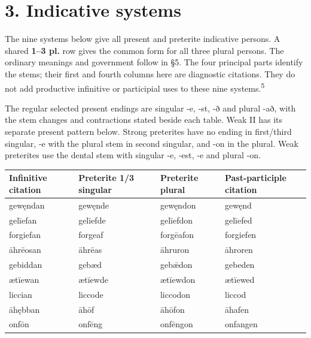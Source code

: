 \section*{3. Indicative systems}

The nine systems below give all present and preterite indicative persons. A shared \textbf{1–3 pl.} row gives the common form for all three plural persons. The ordinary meanings and government follow in §5. The four principal parts identify the stems; their first and fourth columns here are diagnostic citations. They do not add productive infinitive or participial uses to these nine systems.\textsuperscript{5}

The regular selected present endings are singular -e, -st, -ð and plural -að, with the stem changes and contractions stated beside each table. Weak II has its separate present pattern below. Strong preterites have no ending in first/\allowbreak{}third singular, -e with the plural stem in second singular, and -on in the plural. Weak preterites use the dental stem with singular -e, -est, -e and plural -on.

\par\begingroup
\fontsize{10.5}{13.2}\selectfont
\setlength{\LTleft}{0pt}\setlength{\LTright}{\fill}
\noindent
\begin{tabular}{@{}>{\raggedright\arraybackslash}p{27.02mm}>{\raggedright\arraybackslash}p{28.55mm}>{\raggedright\arraybackslash}p{23.36mm}>{\raggedright\arraybackslash}p{36.63mm}@{}}
\toprule
\textbf{Infinitive citation} & \textbf{Preterite 1/\allowbreak{}3 singular} & \textbf{Preterite plural} & \textbf{Past-participle citation} \\
\midrule
gewęndan & gewęnde & gewęndon & gewęnd \\
gelīefan & gelīefde & gelīefdon & gelīefed \\
forgiefan & forgeaf & forgēafon & forgiefen \\
āhrēosan & āhrēas & āhruron & āhroren \\
gebiddan & gebæd & gebǣdon & gebeden \\
ætīewan & ætīewde & ætīewdon & ætīewed \\
liccian & liccode & liccodon & liccod \\
āhębban & āhōf & āhōfon & āhafen \\
onfōn & onfēng & onfēngon & onfangen \\
\bottomrule
\end{tabular}
\par\endgroup

